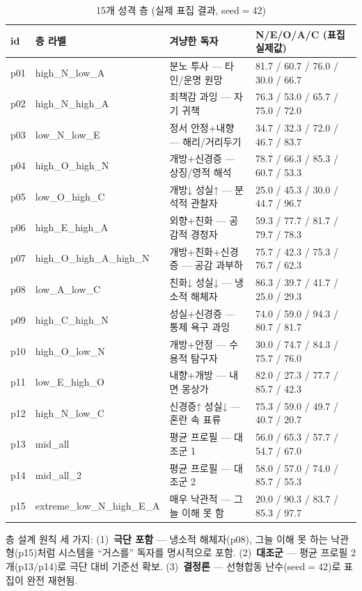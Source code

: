 \documentclass[11pt, a4paper]{article}
\begin{document}
\begin{table}[H]
\centering
\caption{15개 성격 층 (실제 표집 결과, seed$=$42)}
\label{tab:strata}
\small
\begin{tabular}{l l p{4.6cm} l}
\toprule
\textbf{id} & \textbf{층 라벨} & \textbf{겨냥한 독자} & \textbf{N/E/O/A/C (표집 실제값)} \\
\midrule
p01 & high\_N\_low\_A & 분노 투사 --- 타인/운명 원망 & 81.7 / 60.7 / 76.0 / 30.0 / 66.7 \\
p02 & high\_N\_high\_A & 죄책감 과잉 --- 자기 귀책 & 76.3 / 53.0 / 65.7 / 75.0 / 72.0 \\
p03 & low\_N\_low\_E & 정서 안정+내향 --- 해리/거리두기 & 34.7 / 32.3 / 72.0 / 46.7 / 83.7 \\
p04 & high\_O\_high\_N & 개방+신경증 --- 상징/영적 해석 & 78.7 / 66.3 / 85.3 / 60.7 / 53.3 \\
p05 & low\_O\_high\_C & 개방↓ 성실↑ --- 분석적 관찰자 & 25.0 / 45.3 / 30.0 / 44.7 / 96.7 \\
p06 & high\_E\_high\_A & 외향+친화 --- 공감적 경청자 & 59.3 / 77.7 / 81.7 / 79.7 / 78.3 \\
p07 & high\_O\_high\_A\_high\_N & 개방+친화+신경증 --- 공감 과부하 & 75.7 / 42.3 / 75.3 / 76.7 / 62.3 \\
p08 & low\_A\_low\_C & 친화↓ 성실↓ --- 냉소적 해체자 & 86.3 / 39.7 / 41.7 / 25.0 / 29.3 \\
p09 & high\_C\_high\_N & 성실+신경증 --- 통제 욕구 과잉 & 74.0 / 59.0 / 94.3 / 80.7 / 81.7 \\
p10 & high\_O\_low\_N & 개방+안정 --- 수용적 탐구자 & 30.0 / 74.7 / 84.3 / 75.7 / 76.0 \\
p11 & low\_E\_high\_O & 내향+개방 --- 내면 몽상가 & 82.0 / 27.3 / 77.7 / 85.7 / 42.3 \\
p12 & high\_N\_low\_C & 신경증↑ 성실↓ --- 혼란 속 표류 & 75.3 / 59.0 / 49.7 / 40.7 / 20.7 \\
p13 & mid\_all & 평균 프로필 --- 대조군 1 & 56.0 / 65.3 / 57.7 / 54.7 / 67.0 \\
p14 & mid\_all\_2 & 평균 프로필 --- 대조군 2 & 58.0 / 57.0 / 74.0 / 85.7 / 55.3 \\
p15 & extreme\_low\_N\_high\_E\_A & 매우 낙관적 --- 그늘 이해 못 함 & 20.0 / 90.3 / 83.7 / 85.3 / 97.7 \\
\bottomrule
\end{tabular}
\end{table}

층 설계 원칙 세 가지: (1)~\textbf{극단 포함} --- 냉소적 해체자(p08), 그늘 이해 못 하는 낙관형(p15)처럼 시스템을 ``거스를'' 독자를 명시적으로 포함. (2)~\textbf{대조군} --- 평균 프로필 2개(p13/p14)로 극단 대비 기준선 확보. (3)~\textbf{결정론} --- 선형합동 난수(seed$=$42)로 표집이 완전 재현됨.
\end{document}
